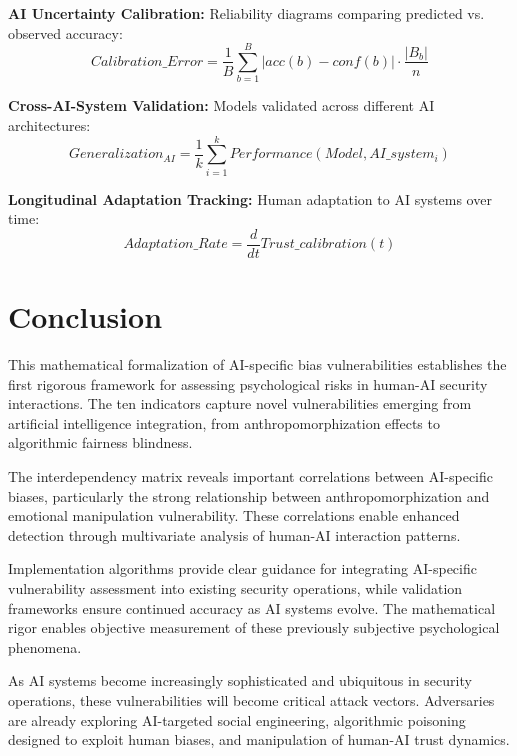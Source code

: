 \documentclass[11pt,a4paper]{article}
\begin{document}
\textbf{AI Uncertainty Calibration:}
Reliability diagrams comparing predicted vs. observed accuracy:
\begin{equation}
Calibration\_Error = \frac{1}{B} \sum_{b=1}^{B} |acc(b) - conf(b)| \cdot \frac{|B_b|}{n}
\end{equation}

\textbf{Cross-AI-System Validation:}
Models validated across different AI architectures:
\begin{equation}
Generalization_{AI} = \frac{1}{k} \sum_{i=1}^{k} Performance(Model, AI\_system_i)
\end{equation}

\textbf{Longitudinal Adaptation Tracking:}
Human adaptation to AI systems over time:
\begin{equation}
Adaptation\_Rate = \frac{d}{dt} Trust\_calibration(t)
\end{equation}

\section{Conclusion}

This mathematical formalization of AI-specific bias vulnerabilities establishes the first rigorous framework for assessing psychological risks in human-AI security interactions. The ten indicators capture novel vulnerabilities emerging from artificial intelligence integration, from anthropomorphization effects to algorithmic fairness blindness.

The interdependency matrix reveals important correlations between AI-specific biases, particularly the strong relationship between anthropomorphization and emotional manipulation vulnerability. These correlations enable enhanced detection through multivariate analysis of human-AI interaction patterns.

Implementation algorithms provide clear guidance for integrating AI-specific vulnerability assessment into existing security operations, while validation frameworks ensure continued accuracy as AI systems evolve. The mathematical rigor enables objective measurement of these previously subjective psychological phenomena.

As AI systems become increasingly sophisticated and ubiquitous in security operations, these vulnerabilities will become critical attack vectors. Adversaries are already exploring AI-targeted social engineering, algorithmic poisoning designed to exploit human biases, and manipulation of human-AI trust dynamics.
\end{document}
